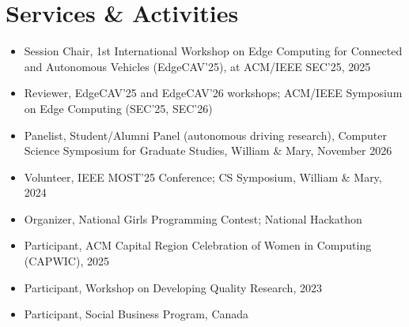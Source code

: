\documentclass[11pt,letterpaper]{article}
\newenvironment{numbered}[1][3.1em]
  {\begin{itemize}[leftmargin=#1, labelwidth=\dimexpr#1-0.5em\relax,
                   labelsep=0.5em, align=left, itemsep=3pt, topsep=2pt]}
  {\end{itemize}}
\begin{document}
\section{Services \& Activities}
\begin{numbered}
  \item[{[S5]}] Session Chair, 1st International Workshop on Edge Computing for
    Connected and Autonomous Vehicles (EdgeCAV'25), at ACM/IEEE SEC'25, 2025
  \item[{[S4]}] Reviewer, EdgeCAV'25 and EdgeCAV'26 workshops; ACM/IEEE Symposium
    on Edge Computing (SEC'25, SEC'26)
  \item[{[S3]}] Panelist, Student/Alumni Panel (autonomous driving research),
    Computer Science Symposium for Graduate Studies, William \& Mary, November 2026
  \item[{[S2]}] Volunteer, IEEE MOST'25 Conference; CS Symposium, William \& Mary, 2024
  \item[{[S1]}] Organizer, National Girls Programming Contest; National Hackathon
  \item[{[E3]}] Participant, ACM Capital Region Celebration of Women in Computing
    (CAPWIC), 2025
  \item[{[E2]}] Participant, Workshop on Developing Quality Research, 2023
  \item[{[E1]}] Participant, Social Business Program, Canada
\end{numbered}
\end{document}
